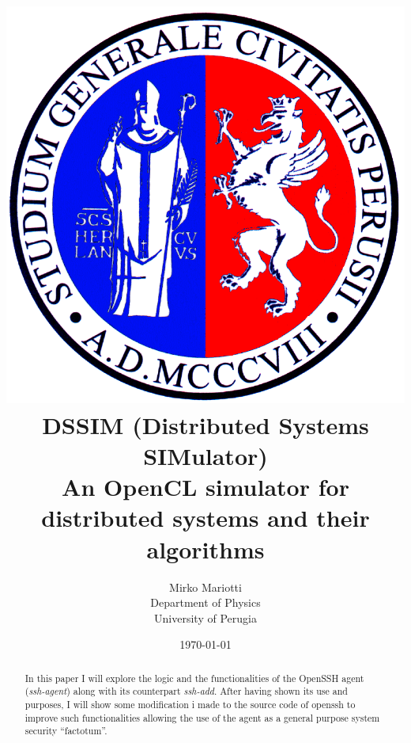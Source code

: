 \documentclass[12pt]{article}
\title{ \includegraphics[scale=0.1]{logo} \\
	\vspace{1cm}
	DSSIM (Distributed Systems SIMulator) \\
	An OpenCL simulator for distributed systems and their algorithms}
\author{Mirko Mariotti \\ Department of Physics \\ University of Perugia}
\date{\today}
\begin{document}
\maketitle

\begin{abstract}
In this paper I will explore the logic and the functionalities of the OpenSSH agent (\emph{ssh-agent}) along with its counterpart \emph{ssh-add}. After having shown its use and purposes, I will show some modification i made to the source code of openssh to improve such functionalities allowing the use of the agent as a general purpose system security ``factotum''.
\end{abstract}

\newpage
\tableofcontents
\newpage

\end{document}
